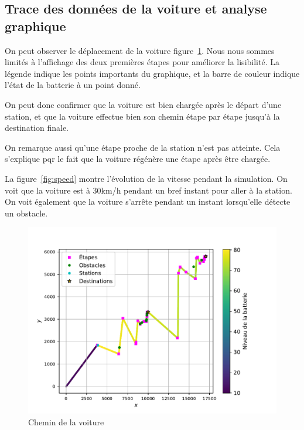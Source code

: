 \documentclass[conference]{IEEEtran}
\begin{document}
\subsection{Trace des données de la voiture et analyse graphique}

On peut observer le déplacement de la voiture figure~\ref{fig:path}. Nous nous sommes limités à l'affichage des deux premières étapes pour améliorer la lisibilité. La légende indique les points importants du graphique, et la barre de couleur indique l'état de la batterie à un point donné.

On peut donc confirmer que la voiture est bien chargée après le départ d'une station, et que la voiture effectue bien son chemin étape par étape jusqu'à la destination finale.

On remarque aussi qu'une étape proche de la station n'est pas atteinte. Cela s'explique pqr le fait que la voiture régénère une étape après être chargée.

La figure~\ref{fig:speed} montre l'évolution de la vitesse pendant la simulation. On voit que la voiture est à 30km/h pendant un bref instant pour aller à la station. On voit également que la voiture s'arrête pendant un instant lorsqu'elle détecte un obstacle.

\begin{figure}[h]
    \centering
    \includegraphics[width=1.1\linewidth]{path.pdf}  
    \caption{Chemin de la voiture}
    \label{fig:path}
\end{figure}
\end{document}
